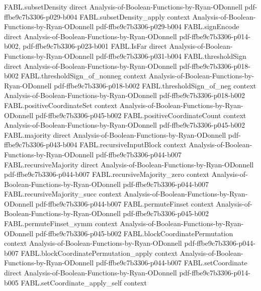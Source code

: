 \begin{theorem}
\proofstep
  {FABL.subsetDensity}
  {direct}
  {Analysis-of-Boolean-Functions-by-Ryan-ODonnell}
  {pdf-ffbe9c7b3306-p029-b004}
\proofstep
  {FABL.subsetDensity_apply}
  {context}
  {Analysis-of-Boolean-Functions-by-Ryan-ODonnell}
  {pdf-ffbe9c7b3306-p029-b004}
\proofstep
  {FABL.signEncode}
  {direct}
  {Analysis-of-Boolean-Functions-by-Ryan-ODonnell}
  {pdf-ffbe9c7b3306-p014-b002,
    pdf-ffbe9c7b3306-p023-b001}
\proofstep
  {FABL.IsFar}
  {direct}
  {Analysis-of-Boolean-Functions-by-Ryan-ODonnell}
  {pdf-ffbe9c7b3306-p031-b004}
\proofstep
  {FABL.thresholdSign}
  {direct}
  {Analysis-of-Boolean-Functions-by-Ryan-ODonnell}
  {pdf-ffbe9c7b3306-p018-b002}
\proofstep
  {FABL.thresholdSign_of_nonneg}
  {context}
  {Analysis-of-Boolean-Functions-by-Ryan-ODonnell}
  {pdf-ffbe9c7b3306-p018-b002}
\proofstep
  {FABL.thresholdSign_of_neg}
  {context}
  {Analysis-of-Boolean-Functions-by-Ryan-ODonnell}
  {pdf-ffbe9c7b3306-p018-b002}
\proofstep
  {FABL.positiveCoordinateSet}
  {context}
  {Analysis-of-Boolean-Functions-by-Ryan-ODonnell}
  {pdf-ffbe9c7b3306-p045-b002}
\proofstep
  {FABL.positiveCoordinateCount}
  {context}
  {Analysis-of-Boolean-Functions-by-Ryan-ODonnell}
  {pdf-ffbe9c7b3306-p045-b002}
\proofstep
  {FABL.majority}
  {direct}
  {Analysis-of-Boolean-Functions-by-Ryan-ODonnell}
  {pdf-ffbe9c7b3306-p043-b004}
\proofstep
  {FABL.recursiveInputBlock}
  {context}
  {Analysis-of-Boolean-Functions-by-Ryan-ODonnell}
  {pdf-ffbe9c7b3306-p044-b007}
\proofstep
  {FABL.recursiveMajority}
  {direct}
  {Analysis-of-Boolean-Functions-by-Ryan-ODonnell}
  {pdf-ffbe9c7b3306-p044-b007}
\proofstep
  {FABL.recursiveMajority_zero}
  {context}
  {Analysis-of-Boolean-Functions-by-Ryan-ODonnell}
  {pdf-ffbe9c7b3306-p044-b007}
\proofstep
  {FABL.recursiveMajority_succ}
  {context}
  {Analysis-of-Boolean-Functions-by-Ryan-ODonnell}
  {pdf-ffbe9c7b3306-p044-b007}
\proofstep
  {FABL.permuteFinset}
  {context}
  {Analysis-of-Boolean-Functions-by-Ryan-ODonnell}
  {pdf-ffbe9c7b3306-p045-b002}
\proofstep
  {FABL.permuteFinset_symm}
  {context}
  {Analysis-of-Boolean-Functions-by-Ryan-ODonnell}
  {pdf-ffbe9c7b3306-p045-b002}
\proofstep
  {FABL.blockCoordinatePermutation}
  {context}
  {Analysis-of-Boolean-Functions-by-Ryan-ODonnell}
  {pdf-ffbe9c7b3306-p044-b007}
\proofstep
  {FABL.blockCoordinatePermutation_apply}
  {context}
  {Analysis-of-Boolean-Functions-by-Ryan-ODonnell}
  {pdf-ffbe9c7b3306-p044-b007}
\proofstep
  {FABL.setCoordinate}
  {direct}
  {Analysis-of-Boolean-Functions-by-Ryan-ODonnell}
  {pdf-ffbe9c7b3306-p014-b005}
\proofstep
  {FABL.setCoordinate_apply_self}
  {context}

\end{theorem}

